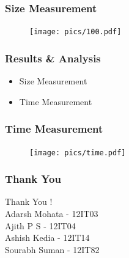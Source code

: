 \documentclass[14pt,xcolor=dvipsnames]{beamer}
\begin{document}
\begin{frame}
 \frametitle{Size Measurement}
 \begin{figure}
 \centering
 \texttt{[image: pics/100.pdf]}
 \end{figure}
\end{frame}

\begin{frame}
 \frametitle{Results \& Analysis}
 \begin{itemize}
  \item Size Measurement
  \item Time Measurement
 \end{itemize}
\end{frame}

\begin{frame}
 \frametitle{Time Measurement}
 \begin{figure}
 \centering
 \texttt{[image: pics/time.pdf]}
 \end{figure}
\end{frame}

\begin{frame}
\frametitle{Thank You}
 \huge
 \centering
 \vspace{1cm}
 Thank You ! \\
 \vspace{1.5cm}
 \flushright 
 \flushbottom
 \small
 Adarsh Mohata - 12IT03 \\
 Ajith P S - 12IT04\\
 Ashish Kedia - 12IT14 \\
 Sourabh Suman - 12IT82
\end{frame}
\end{document}
